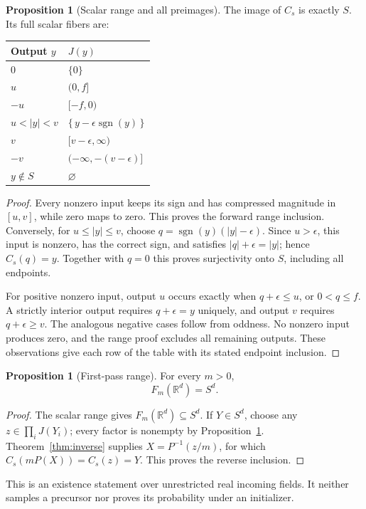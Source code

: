 \documentclass[11pt,a4paper]{article}
\theoremstyle{definition}
\newtheorem{proposition}[theorem]{Proposition}
\theoremstyle{remark}\newtheorem{remark}[theorem]{Remark}
\DeclareMathOperator{\sgn}{sgn}
\newcommand{\R}{\mathbb R}
\numberwithin{equation}{section}
\begin{document}
\begin{proposition}[Scalar range and all preimages]\label{prop:fibers}
The image of $C_s$ is exactly $S$. Its full scalar fibers are:
\begin{center}
\begin{tabular}{@{}ll@{}}
\toprule Output $y$ & $J(y)$\\
\midrule
$0$ & $\{0\}$\\
$u$ & $(0,f]$\\
$-u$ & $[-f,0)$\\
$u<|y|<v$ & $\{\,y-\epsilon\sgn(y)\,\}$\\
$v$ & $[v-\epsilon,\infty)$\\
$-v$ & $(-\infty,-(v-\epsilon)]$\\
$y\notin S$ & $\varnothing$\\
\bottomrule
\end{tabular}
\end{center}
\end{proposition}
\begin{proof}
Every nonzero input keeps its sign and has compressed magnitude in $[u,v]$,
while zero maps to zero. This proves the forward range inclusion.
Conversely, for $u\leq|y|\leq v$, choose
$q=\sgn(y)(|y|-\epsilon)$. Since $u>\epsilon$, this input is nonzero, has the
correct sign, and satisfies $|q|+\epsilon=|y|$; hence $C_s(q)=y$.
Together with $q=0$ this proves surjectivity onto $S$, including all endpoints.

For positive nonzero input, output $u$ occurs exactly when
$q+\epsilon\leq u$, or $0<q\leq f$. A strictly interior output requires
$q+\epsilon=y$ uniquely, and output $v$ requires $q+\epsilon\geq v$.
The analogous negative cases follow from oddness. No nonzero input produces
zero, and the range proof excludes all remaining outputs. These observations
give each row of the table with its stated endpoint inclusion.
\end{proof}

\begin{proposition}[First-pass range]\label{prop:range}
For every $m>0$,
\begin{equation}\label{eq:range}
 F_m(\R^d)=S^d.
\end{equation}
\end{proposition}
\begin{proof}
The scalar range gives $F_m(\R^d)\subseteq S^d$. If $Y\in S^d$, choose any
$z\in\prod_i J(Y_i)$; every factor is nonempty by Proposition~\ref{prop:fibers}.
Theorem~\ref{thm:inverse} supplies $X=P^{-1}(z/m)$, for which
$C_s(mP(X))=C_s(z)=Y$. This proves the reverse inclusion.
\end{proof}
This is an existence statement over unrestricted real incoming fields. It neither
samples a precursor nor proves its probability under an initializer.
\end{document}
